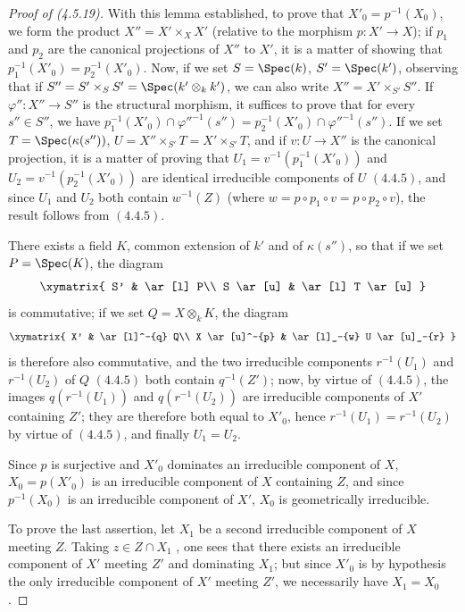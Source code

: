\begin{proof}[Proof of {\rm (4.5.19)}]
With this lemma established, to prove that $X'_0=p^{-1}(X_0)$, we form the product $X''=X'\times_X X'$ (relative to the morphism $p:X'\to X$); if $p_1$ and $p_2$ are the canonical projections of $X''$ to $X'$, it is a matter of showing that $p_1^{-1}(X'_0)=p_2^{-1}(X'_0)$.
Now, if we set $S=\Spec(k)$, $S'=\Spec(k')$, observing that if $S''=S'\times_S S'=\Spec(k'\otimes_k k')$, we can also write $X''=X'\times_{S'}S''$.
If $\varphi'':X''\to S''$ is the structural morphism, it suffices to prove that for every $s''\in S''$, we have $p_1^{-1}(X'_0)\cap\varphi''^{-1}(s'')=p_2^{-1}(X'_0)\cap\varphi''^{-1}(s'')$.
If we set $T=\Spec(\kappa(s''))$, $U=X''\times_{S'}T=X'\times_{S'}T$, and if $v:U\to X''$ is the canonical projection, it is a matter of proving that $U_1=v^{-1}(p_1^{-1}(X'_0))$ and $U_2=v^{-1}(p_2^{-1}(X'_0))$ are identical irreducible components of $U$ $(4.4.5)$, and since $U_1$ and $U_2$ both contain $w^{-1}(Z)$ (where $w=p\circ p_1\circ v=p\circ p_2\circ v$), the result follows from $(4.4.5)$.


There exists a field $K$, common extension of $k'$ and of $\kappa(s'')$, so that if we set $P=\Spec(K)$, the diagram
\[
\xymatrix{
S' & \ar[l] P\\
S \ar[u] & \ar[l] T \ar[u]
}
\]
is commutative; if we set $Q=X\otimes_k K$, the diagram
\[
\xymatrix{
X' & \ar[l]^-{q} Q\\
X \ar[u]^-{p} & \ar[l]_-{w} U \ar[u]_-{r}
}
\]
is therefore also commutative, and the two irreducible components $r^{-1}(U_1)$ and $r^{-1}(U_2)$ of $Q$ $(4.4.5)$ both contain $q^{-1}(Z')$; now, by virtue of $(4.4.5)$, the images $q(r^{-1}(U_1))$ and $q(r^{-1}(U_2))$ are irreducible components of $X'$ containing $Z'$; they are therefore both equal to $X'_0$, hence $r^{-1}(U_1)=r^{-1}(U_2)$ by virtue of $(4.4.5)$, and finally $U_1=U_2$.

Since $p$ is surjective and $X'_0$ dominates an irreducible component of $X$, $X_0=p(X'_0)$ is an irreducible component of $X$ containing $Z$, and since $p^{-1}(X_0)$ is an irreducible component of $X'$, $X_0$ is geometrically irreducible.

To prove the last assertion, let $X_1$ be a second irreducible component of $X$ meeting $Z$.
Taking $z\in Z\cap X_1$ , one sees that there exists an irreducible component of $X'$ meeting $Z'$ and dominating $X_1$; but since $X'_0$ is by hypothesis the only irreducible component of $X'$ meeting $Z'$, we necessarily have $X_1=X_0$.
\end{proof}


